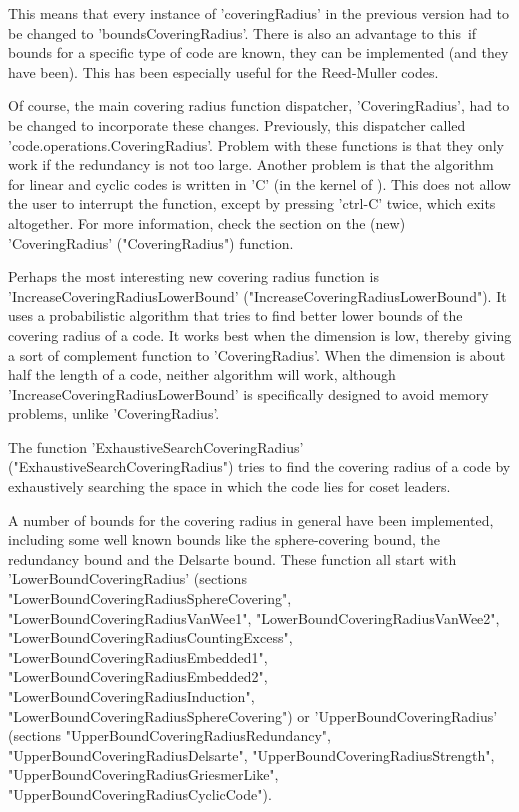 This means that every instance of 'coveringRadius' in the
previous version had to be changed to
'boundsCoveringRadius'.
There is also an advantage to this\:\ if bounds for a specific type
of code are known, they can be implemented (and they have been).
This has been especially useful for the Reed-Muller codes.

Of course, the main covering radius function dispatcher,
'CoveringRadius', had to be changed to incorporate these changes.
Previously, this dispatcher called\\
'code.operations.CoveringRadius'.
Problem with these functions is that they only work if the redundancy
is not too large.
Another problem is that the algorithm for linear and cyclic codes
is written in 'C' (in the kernel of \GAP{}).
This does not allow the user to interrupt the function, except by
pressing 'ctrl-C' twice, which exits \GAP{} altogether.
For more information, check the section on the (new) 'CoveringRadius'
("CoveringRadius") function.

Perhaps the most interesting new covering radius function is\\
'IncreaseCoveringRadiusLowerBound'
("IncreaseCoveringRadiusLowerBound").
It uses a probabilistic algorithm that tries to find better lower
bounds of the covering radius of a code.
It works best when the dimension is low, thereby giving a sort of
complement function to 'CoveringRadius'.
When the dimension is about half the length of a code,
neither algorithm will work, although 'IncreaseCoveringRadiusLowerBound'
is specifically designed to avoid memory problems,
unlike 'CoveringRadius'.

The function 'ExhaustiveSearchCoveringRadius'
("ExhaustiveSearchCoveringRadius") tries
to find the covering radius of a code by exhaustively searching
the space in which the code lies for coset leaders.

A number of bounds for the covering radius in general have been implemented,
including some well known bounds like the sphere-covering bound,
the redundancy bound and the Delsarte bound.
These function all start with 'LowerBoundCoveringRadius' 
(sections "LowerBoundCoveringRadiusSphereCovering",
"LowerBoundCoveringRadiusVanWee1",
"LowerBoundCoveringRadiusVanWee2",
"LowerBoundCoveringRadiusCountingExcess",
"LowerBoundCoveringRadiusEmbedded1",
"LowerBoundCoveringRadiusEmbedded2",
"LowerBoundCoveringRadiusInduction",
"LowerBoundCoveringRadiusSphereCovering")
or 'UpperBoundCoveringRadius' 
(sections "UpperBoundCoveringRadiusRedundancy",
"UpperBoundCoveringRadiusDelsarte",
"UpperBoundCoveringRadiusStrength",
"UpperBoundCoveringRadiusGriesmerLike",
"UpperBoundCoveringRadiusCyclicCode").

